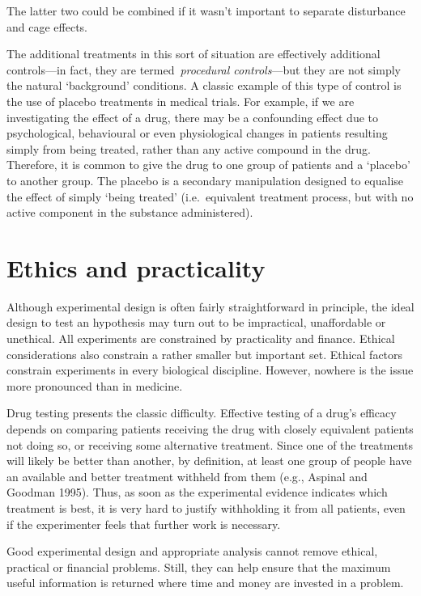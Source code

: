 \documentclass[
]{book}
\begin{document}
The latter two could be combined if it wasn't important to separate disturbance and cage effects.

The additional treatments in this sort of situation are effectively additional controls---in fact, they are termed~\emph{procedural controls}---but they are not simply the natural `background' conditions. A classic example of this type of control is the use of placebo treatments in medical trials. For example, if we are investigating the effect of a drug, there may be a confounding effect due to psychological, behavioural or even physiological changes in patients resulting simply from being treated, rather than any active compound in the drug. Therefore, it is common to give the drug to one group of patients and a `placebo' to another group. The placebo is a secondary manipulation designed to equalise the effect of simply `being treated' (i.e.~equivalent treatment process, but with no active component in the substance administered).

\hypertarget{ethics-and-practicality}{%
\section{Ethics and practicality}\label{ethics-and-practicality}}

Although experimental design is often fairly straightforward in principle, the ideal design to test an hypothesis may turn out to be impractical, unaffordable or unethical. All experiments are constrained by practicality and finance. Ethical considerations also constrain a rather smaller but important set. Ethical factors constrain experiments in every biological discipline. However, nowhere is the issue more pronounced than in medicine.

Drug testing presents the classic difficulty. Effective testing of a drug's efficacy depends on comparing patients receiving the drug with closely equivalent patients not doing so, or receiving some alternative treatment. Since one of the treatments will likely be better than another, by definition, at least one group of people have an available and better treatment withheld from them (e.g., Aspinal and Goodman 1995). Thus, as soon as the experimental evidence indicates which treatment is best, it is very hard to justify withholding it from all patients, even if the experimenter feels that further work is necessary.

Good experimental design and appropriate analysis cannot remove ethical, practical or financial problems. Still, they can help ensure that the maximum useful information is returned where time and money are invested in a problem.
\end{document}
